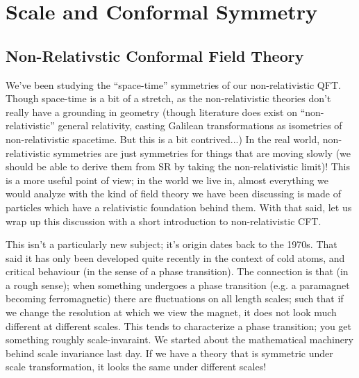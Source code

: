 \section{Scale and Conformal Symmetry}
\subsection{Non-Relativstic Conformal Field Theory}
We've been studying the ``space-time'' symmetries of our non-relativistic QFT. Though space-time is a bit of a stretch, as the non-relativistic theories don't really have a grounding in geometry (though literature does exist on ``non-relativistic'' general relativity, casting Galilean transformations as isometries of non-relativistic spacetime. But this is a bit contrived...) In the real world, non-relativistic symmetries are just symmetries for things that are moving slowly (we should be able to derive them from SR by taking the non-relativistic limit)! This is a more useful point of view; in the world we live in, almost everything we would analyze with the kind of field theory we have been discussing is made of particles which have a relativistic foundation behind them. With that said, let us wrap up this discussion with a short introduction to non-relativistic CFT. 

This isn't a particularly new subject; it's origin dates back to the 1970s. That said it has only been developed quite recently in the context of cold atoms, and critical behaviour (in the sense of a phase transition). The connection is that (in a rough sense); when something undergoes a phase transition (e.g. a paramagnet becoming ferromagnetic) there are fluctuations on all length scales; such that if we change the resolution at which we view the magnet, it does not look much different at different scales. This tends to characterize a phase transition; you get something roughly scale-invaraint. We started about the mathematical machinery behind scale invariance last day. If we have a theory that is symmetric under scale transformation, it looks the same under different scales!

